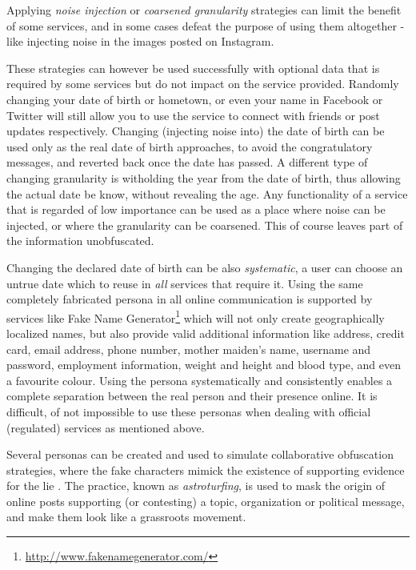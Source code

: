 \documentclass{IOS-Book-Article}     %
\newcommand{\tbox}[3][red]{{
\color{#1}\noindent{
   \fbox{\scriptsize{ {\bf #2} \textsl{#3}}}
   \vspace{2pt}
}
}}
\newcommand{\todo}[1]{\tbox{TODO:}{#1}}
\begin{document}
Applying \emph{noise injection} or \emph{coarsened granularity} strategies can 
limit the benefit of some services, and in some cases defeat the purpose of 
using them altogether - like injecting noise in the images posted on Instagram.

These strategies can however be used successfully with optional data that 
is required by some services but do not impact on the service provided. 
Randomly changing your date of birth or hometown, or even your name in Facebook 
or Twitter will still allow you to use the service to connect with friends or 
post updates respectively. Changing (injecting noise into) the date of birth 
can be used only as the real date of birth approaches, to avoid the 
congratulatory messages, and reverted back once the date has passed. A 
different type of changing granularity is witholding the year from the 
date of birth, thus allowing the actual date be know, without revealing the 
age. Any functionality of a service that is regarded of low importance can be 
used as a place where noise can be injected, or where the granularity can be 
coarsened. This of course leaves part of the information unobfuscated. 

Changing the declared date of birth can be also \emph{systematic}, a user can 
choose an untrue date which to reuse in \emph{all} services that require it. 
Using the same completely fabricated persona in all online communication is 
supported by services like Fake Name 
Generator\footnote{\url{http://www.fakenamegenerator.com/}} which will not only 
create geographically localized names, but also provide valid additional 
information like address, credit card, email address, phone number, mother 
maiden's name, username and password, employment information, weight and height 
and blood type, and even a favourite colour. Using the persona systematically 
and consistently enables a complete separation between the real person and their 
presence online. It is difficult, of not impossible to use these personas when 
dealing with official (regulated) services as mentioned above.

Several personas can be created and used to simulate collaborative obfuscation 
strategies, where the fake characters mimick the existence of supporting 
evidence for the lie \todo{this sentence makes no sense, reformulate}. The 
practice, known as \emph{astroturfing}, is used to mask the origin of online 
posts supporting (or contesting) a topic, organization or political message, 
and make them look like a grassroots movement.
\end{document}
